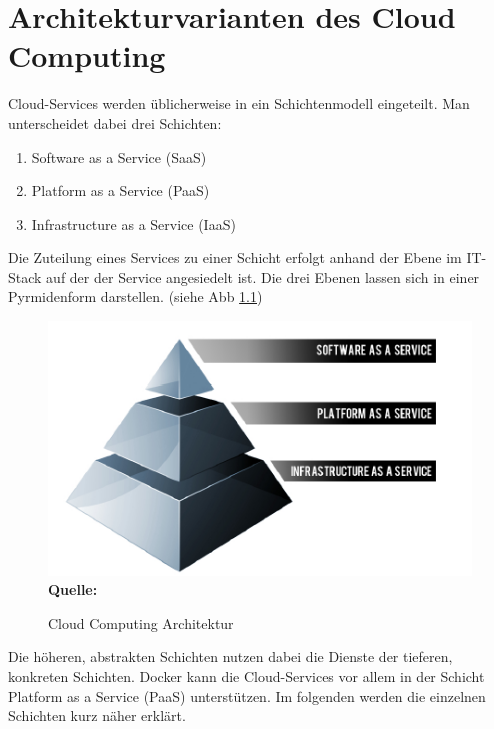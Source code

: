 \chapter{Architekturvarianten des Cloud Computing}
\label{cha:architekturvarianten_des_cloud_computing}
Cloud-Services werden üblicherweise in ein Schichtenmodell eingeteilt. Man unterscheidet dabei drei Schichten:
\begin{enumerate}
      \itemsep0pt
      \item Software as a Service (SaaS)
      \item Platform as a Service (PaaS)
      \item Infrastructure as a Service (IaaS)
\end{enumerate}
Die Zuteilung eines Services zu einer Schicht erfolgt anhand der Ebene im IT-Stack auf der der Service angesiedelt ist.
Die drei Ebenen lassen sich in einer Pyrmidenform darstellen. (siehe Abb \ref{fig:iaas_paas_saas}) 

\begin{figure}[htb]
  \centering  
  \includegraphics[scale=0.7]{img/iaas_paas_saas.png}\\
  \footnotesize\sffamily\textbf{Quelle:} \cite{kepes_understanding_????}
  \caption{Cloud Computing Architektur}
  \label{fig:iaas_paas_saas}
\end{figure}

Die höheren, abstrakten Schichten nutzen dabei die Dienste der tieferen, konkreten Schichten.
Docker kann die Cloud-Services vor allem in der Schicht Platform as a Service (PaaS) unterstützen.
Im folgenden werden die einzelnen Schichten kurz näher erklärt.
